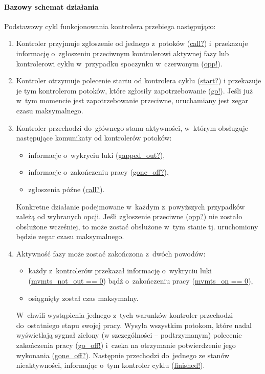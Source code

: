 \documentclass{pracamgr}
\theoremstyle{plain}
\begin{document}
\paragraph{Bazowy schemat działania} Podstawowy cykl funkcjonowania
kontrolera przebiega następująco:
\begin{enumerate}
  \item Kontroler przyjmuje zgłoszenie od jednego z~potoków (\url{call?})
  i~przekazuje informację o~zgłoszeniu przeciwnym kontrolerowi aktywnej
  fazy lub kontrolerowi cyklu w~przypadku spoczynku w~czerwonym (\url{opp!}).
  \item Kontroler otrzymuje polecenie startu od kontrolera cyklu
  (\url{start?}) i przekazuje je tym kontrolerom potoków, które
  zgłosiły zapotrzebowanie (\url{go!}). Jeśli już w~tym momencie jest
  zapotrzebowanie przeciwne, uruchamiany jest zegar czasu
  maksymalnego.
  \item Kontroler przechodzi do~głównego stanu aktywności, w~którym obsługuje
  następujące komunikaty od kontrolerów potoków:
  \begin{itemize}
    \item informacje o~wykryciu luki (\url{gapped_out?}),
    \item informacje o~zakończeniu pracy (\url{gone_off?}),
    \item zgłoszenia późne (\url{call?}).
  \end{itemize}
  Konkretne działanie podejmowane w~każdym z~powyższych przypadków
  zależą od wybranych opcji. Jeśli zgłoszenie przeciwne
  (\url{opp?}) nie zostało obsłużone wcześniej, to może zostać
  obsłużone w~tym stanie tj. uruchomiony będzie zegar czasu
  maksymalnego.
  \item Aktywność fazy może zostać zakończona z~dwóch powodów:
  \begin{itemize}
    \item każdy z~kontrolerów przekazał informację o~wykryciu luki
    (\url{mvmts_not_out == 0}) bądź o~zakończeniu pracy
    (\url{mvmts_on == 0}),
    \item osiągnięty został czas maksymalny.
  \end{itemize}
  W~chwili wystąpienia jednego z~tych warunków kontroler przechodzi
  do~ostatniego etapu swojej pracy. Wysyła wszystkim potokom, które nadal
  wyświetlają sygnał zielony (w szczególności -- podtrzymanym)
  polecenie zakończenia pracy (\url{go_off!}) i~czeka na otrzymanie
  potwierdzenie jego wykonania (\url{gone_off?}). Następnie przechodzi
  do~jednego ze stanów nieaktywności, informując o~tym kontroler cyklu
  (\url{finished!}).
\end{enumerate}
\end{document}
